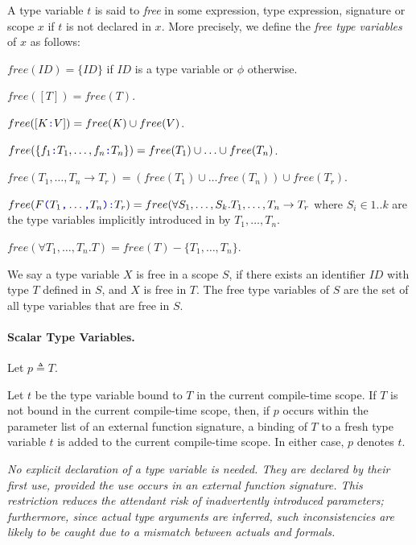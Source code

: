 \documentclass{article}
\begin{document}
 A type variable $t$ is said to {\em free} in some expression, type expression, signature or scope $x$ if $t$ is not declared in $x$.  More precisely, we define the {\em free type variables} of $x$ as follows:
 
 
 $free(ID) = \{ID\}$ if $ID$ is a type variable or $\phi$ otherwise.
 
 $free([T]) = free(T)$.
 
 $free([K \texttt{\color{blue} :}{} V]) = free(K) \cup free(V)$.
 
 $free(\{f_1\texttt{\color{blue} :}{} T_1, \ldots, f_n\texttt{\color{blue} :}{} T_n\}) =  free(T_1) \cup \ldots \cup free(T_n)$.
 
 $free(T_1, \ldots, T_n \to T_r) = (free(T_1) \cup \ldots free(T_n)) \cup free(T_r)$. 
 
 $free(F\texttt{\color{blue} (}{} T_1\texttt{\color{blue} ,}{} \ldots\texttt{\color{blue} ,}{} T_n\texttt{\color{blue} )}\texttt{\color{blue} :}{}T_r) = free(\forall S_1, \ldots, S_k. T_1, \ldots, T_n \to T_r$ where $S_i \in 1..k$ are the type variables implicitly introduced in by $T_1, \ldots, T_n$.
 
 $free(\forall T_1, \ldots, T_n.T) = free(T) - \{T_1, \ldots, T_n\}$.
 
 
 We say a type variable $X$ is free in a scope $S$, if there exists an identifier $ID$ with type $T$ defined in $S$, and $X$ is free in $T$. The free type variables of $S$ are the set of all type variables that are free in $S$.

\paragraph{Scalar Type Variables.}
 
 Let $p \triangleq T$.
 
 Let $t$ be the type variable bound to $T$ in the current compile-time scope. If $T$ is not bound in the current compile-time scope, then, if $p$ occurs within  the parameter list of an external function signature,  a binding of $T$ to a fresh type variable $t$ is added to the current compile-time scope. In either case, $p$ denotes  $t$. 
 
 {\em 
No explicit declaration of a type variable is needed. They are declared by their first use, provided the use occurs in an external function signature. This restriction reduces the attendant risk of inadvertently introduced parameters; furthermore, since
 actual type arguments are inferred, such inconsistencies are likely to be caught due to a mismatch between actuals and formals.
 } 
 
 
\end{document}
